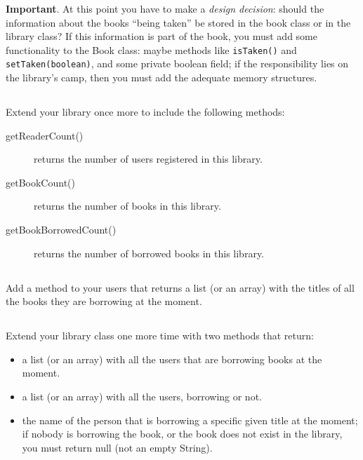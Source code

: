 \documentclass{article}
\begin{document}
\textbf{Important}. At this point you have to make a \emph{design
  decision}: should the information about the books ``being taken'' be
stored in the book class or in the library class? 
If this information is part of the book, you must
add some functionality to the Book class: maybe methods like
\verb+isTaken()+ and \verb+setTaken(boolean)+, and some private
boolean field; if the responsibility lies on the library's camp, then you must
add the adequate memory structures.

\subsection{}

Extend your library once more to include the following methods: 

\begin{description}
\item[getReaderCount()] returns the number of users registered in this
  library. 
\item[getBookCount()] returns the number of books in this library.
\item[getBookBorrowedCount()] returns the number of borrowed books in
  this library. 
\end{description}

\subsection{}

Add a method to your users that returns a list (or an array) with the
titles of all the books they are borrowing at the moment. 

\subsection{}

Extend your library class one more time with two methods that return: 

\begin{itemize}
\item a list (or an array) with all the users that are borrowing books
  at the moment.
\item a list (or an array) with all the users, borrowing or not.
\item the name of the person that is borrowing a specific given title
  at the moment; if nobody is borrowing the book, or the book does not
  exist in the library, you must return null (not an empty String). 
\end{itemize}
\end{document}
